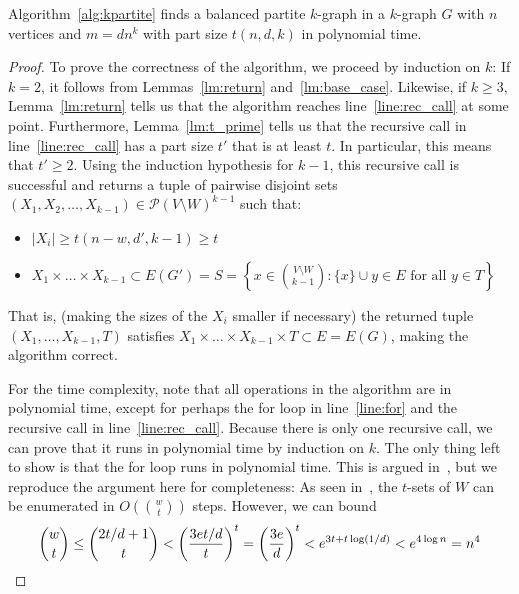 \begin{theorem}
    Algorithm~\ref{alg:kpartite} finds a balanced partite $k$-graph in a $k$-graph $G$ with
    $n$ vertices and $m = d n^k$ with part size $t(n, d, k)$ in polynomial time.
    \begin{proof}
        To prove the correctness of the algorithm, we proceed by induction on $k$:
        If $k=2$, it follows from Lemmas~\ref{lm:return} and~\ref{lm:base_case}.
        Likewise, if $k \geq 3$, Lemma~\ref{lm:return} tells us that the algorithm
        reaches line~\ref{line:rec_call} at some point.
        Furthermore, Lemma~\ref{lm:t_prime} tells us that the recursive call in line~\ref{line:rec_call}
        has a part size $t'$ that is at least $t$.
        In particular, this means that $t' \geq 2$.
        Using the induction hypothesis for $k-1$, this recursive call is successful and
        returns a tuple of pairwise disjoint sets
        $(X_1, X_2, \ldots, X_{k-1}) \in \mathcal{P}(V \setminus W)^{k-1}$ such that:
        \begin{itemize}
            \item $|X_i| \geq t(n-w, d', k-1) \geq t$

            \item $X_1 \times \dots \times X_{k-1} \subset E(G') = S =
            \left\{x \in \binom{V \setminus W}{k-1} : \{x\} \cup y \in E \text{ for all } y \in T\right\}$
        \end{itemize}

        That is, (making the sizes of the $X_i$ smaller if necessary) the returned tuple $(X_1, \dots, X_{k-1}, T)$
        satisfies $X_1 \times \dots \times X_{k-1} \times T \subset E = E(G)$, making the algorithm correct.

        For the time complexity, note that all operations in the algorithm are in polynomial time, %
        except for perhaps the for loop in line~\ref{line:for} and the recursive call in line~\ref{line:rec_call}.
        Because there is only one recursive call, we can prove that it runs in polynomial time
        by induction on $k$.
        The only thing left to show is that the for loop runs in polynomial time.
        This is argued in~\cite{MUBAYI2010174}, but we reproduce the argument here for completeness:
        As seen in~\cite{reingold1977combinatorial}, the $t$-sets of $W$ can be enumerated in
        $O\left( \binom{w}{t} \right)$ steps.
        However, we can bound
        \[
            \binom{w}{t} \leq
            \binom{2t/d + 1}{t} <
            \left( \frac{3et/d}{t} \right)^{t} =
            \left( \frac{3e}{d} \right)^{t} <
            e^{3 t + t \log (1/d)} <
            e^{4 \log n} = n^4 \qedhere
        \]

    \end{proof}
\end{theorem}





